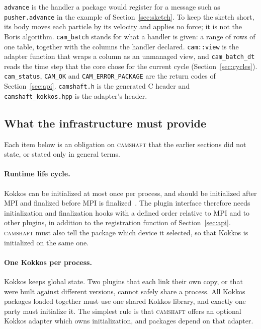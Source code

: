 \documentclass[11pt,a4paper]{article}
\newcommand{\camshaft}{\textsc{camshaft}}
\newcommand{\code}[1]{\texttt{#1}}
\begin{document}
\code{advance} is the handler a package would register for a message such as
\code{pusher.advance} in the example of Section~\ref{sec:sketch}.  To keep
the sketch short, its body moves each particle by its velocity and applies
no force; it is not the Boris algorithm.  \code{cam\_batch} stands for what
a handler is given: a range of rows of one table, together with the columns
the handler declared.  \code{cam::view} is the adapter function that wraps
a column as an unmanaged view, and \code{cam\_batch\_dt} reads the time step
that the core chose for the current cycle (Section~\ref{sec:cycles}).  \code{cam\_status}, \code{CAM\_OK} and
\code{CAM\_ERROR\_PACKAGE} are the return codes of Section~\ref{sec:api}.
\code{camshaft.h} is the generated C header and \code{camshaft\_kokkos.hpp}
is the adapter's header.

\subsection{What the infrastructure must provide}
\label{sec:kokkos-needs}

Each item below is an obligation on \camshaft{} that the earlier sections did not
state, or stated only in general terms.

\paragraph{Runtime life cycle.}  Kokkos can be initialized at most once per
process, and should be initialized after MPI and finalized before MPI is
finalized~\cite{kokkosdocs}.  The
plugin interface therefore needs initialization and finalization hooks with a
defined order relative to MPI and to other plugins, in addition to the
registration function of Section~\ref{sec:api}.  \camshaft{} must also tell the
package which device it selected, so that Kokkos is initialized on the same
one.

\paragraph{One Kokkos per process.}  Kokkos keeps global state.  Two plugins
that each link their own copy, or that were built against different versions,
cannot safely share a process.  All Kokkos packages loaded together must use
one shared Kokkos library, and exactly one party must initialize it.  The
simplest rule is that \camshaft{} offers an optional Kokkos adapter which owns
initialization, and packages depend on that adapter.
\end{document}

